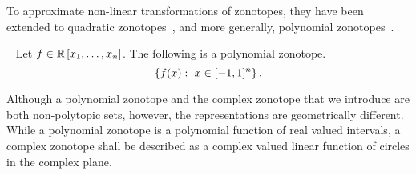 To approximate non-linear transformations of zonotopes, they have been
extended to quadratic zonotopes~\cite{DBLP:conf/aplas/AdjeGW15}, and more generally, polynomial
zonotopes~\cite{DBLP:conf/hybrid/Althoff13}. 
%
\begin{definition}~\cite{DBLP:conf/hybrid/Althoff13}
Let $f\in\mathbb{R}\left[x_1,\ldots,x_n\right]$.  The following is a
polynomial zonotope.
%
\[\left\{f(x):~x\in[-1,1]^n\right\}.\]
%
\end{definition}
%
Although a polynomial zonotope and the complex zonotope that we
introduce are both non-polytopic sets, however, the representations
are geometrically different.  While a polynomial zonotope is a
polynomial function of real valued intervals, a complex zonotope shall
be described as a complex valued linear function of circles in the
complex plane.
